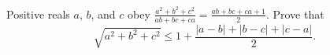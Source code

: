 Positive reals $a$, $b$, and $c$ obey $\frac{a^2+b^2+c^2}{ab+bc+ca} = \frac{ab+bc+ca+1}{2}$.  Prove that \[ \sqrt{a^2+b^2+c^2} \le 1 + \frac{\lvert a-b \rvert + \lvert b-c \rvert + \lvert c-a \rvert}{2}. \]